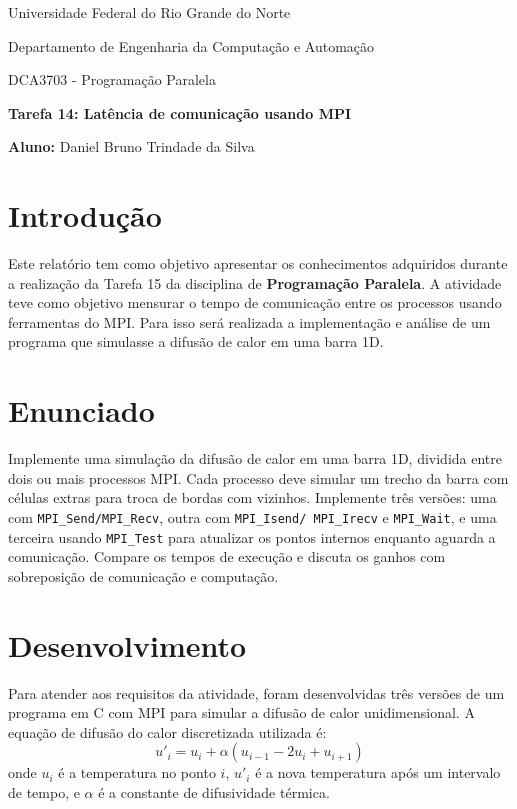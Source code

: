 \documentclass[a4paper, 12pt]{article}
\begin{document}
	
	\begin{center}
		Universidade Federal do Rio Grande do Norte
		
		Departamento de Engenharia da Computação e Automação  
		
		DCA3703 - Programação Paralela  
		
		\textbf{Tarefa 14: Latência de comunicação usando MPI}  
		
		\textbf{Aluno:} Daniel Bruno Trindade da Silva  
	\end{center}  
	
	\section{Introdução}
	
	\hspace{0.62cm}Este relatório tem como objetivo apresentar os conhecimentos adquiridos durante a realização da Tarefa 15 da disciplina de \textbf{Programação Paralela}. A atividade teve como objetivo mensurar o tempo de comunicação entre os processos usando ferramentas do MPI. Para isso será realizada a implementação e análise de um programa que simulasse a difusão de calor em uma barra 1D. 
	
	\section{Enunciado}
	
	\hspace{0.62cm}Implemente uma simulação da difusão de calor em uma barra 1D, dividida entre dois ou mais processos MPI. Cada processo deve simular um trecho da barra com células extras para troca de bordas com vizinhos. Implemente três versões: uma com \texttt{MPI\_Send/MPI\_Recv}, outra com \texttt{MPI\_Isend/ MPI\_Irecv} e \texttt{MPI\_Wait}, e uma terceira usando \texttt{MPI\_Test} para atualizar os pontos internos enquanto aguarda a comunicação. Compare os tempos de execução e discuta os ganhos com sobreposição de comunicação e computação.
	
	\section{Desenvolvimento}
	Para atender aos requisitos da atividade, foram desenvolvidas três versões de um programa em C com MPI para simular a difusão de calor unidimensional. A equação de difusão do calor discretizada utilizada é:
	$$ u'_i = u_i + \alpha (u_{i-1} - 2u_i + u_{i+1}) $$
	onde $u_i$ é a temperatura no ponto $i$, $u'_i$ é a nova temperatura após um intervalo de tempo, e $\alpha$ é a constante de difusividade térmica.
	
\end{document}
